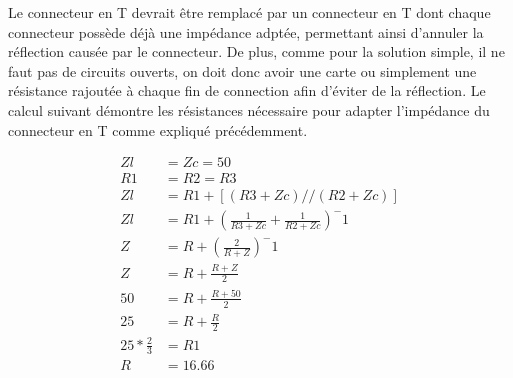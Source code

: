  Le connecteur en T devrait être remplacé par un connecteur en T dont chaque connecteur possède déjà une impédance adptée, permettant ainsi
 d'annuler la réflection causée par le connecteur. De plus, comme pour la solution simple, il ne faut pas de circuits ouverts, on doit donc avoir
 une carte ou simplement une résistance rajoutée à chaque fin de connection afin d'éviter de la réflection. Le calcul suivant démontre les résistances
 nécessaire pour adapter l'impédance du connecteur en T comme expliqué précédemment.

 \begin{equation}
    \begin{aligned}
        Zl & = Zc = 50 \\
        R1 & = R2 = R3 \\
        Zl & = R1 + [(R3 + Zc) // (R2 + Zc)] \\
        Zl & = R1 + (\frac{1}{R3 + Zc} + \frac{1}{R2 + Zc})^-1 \\
        Z & = R + (\frac{2}{R + Z})^-1 \\
        Z & = R + \frac{R + Z}{2} \\
        50 & = R + \frac{R + 50}{2} \\
        25 & = R + \frac{R}{2} \\
        25 * \frac{2}{3} & = R1 \\
        R & = 16.66 \\
        \label{eq:equation-longueur-simple}
    \end{aligned}
 \end{equation}
